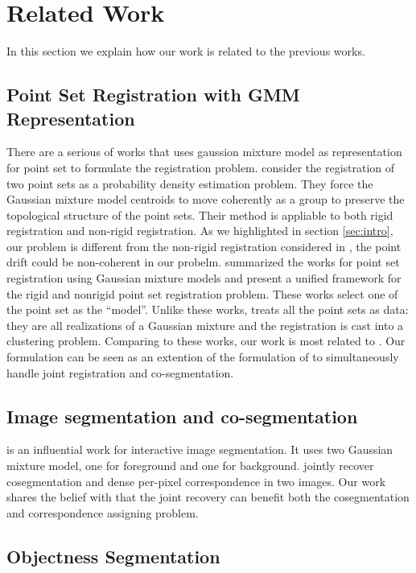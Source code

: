\section{Related Work}
\label{sec:rw}
In this section we explain how our work is related to the previous works.
\subsection{Point Set Registration with GMM Representation}
\label{subsec:gmmreg}
There are a serious of works that uses gaussion mixture model as representation for point set to formulate the registration problem.
\cite{CPD} consider the registration of two point sets as a probability density estimation problem. They force the Gaussian mixture model centroids to move coherently as a group to preserve the topological structure of the point sets. Their method is appliable to both rigid registration and non-rigid registration. As we highlighted in section \ref{sec:intro}, our problem is different from the non-rigid registration considered in \cite{CPD}, the point drift could be non-coherent in our probelm.\cite{GMM_PAMI} summarized the works for point set registration using Gaussian mixture models and present a unified framework for the rigid and nonrigid point set registration problem. These works select one of the point set as the ``model''. Unlike these works, \cite{Evangelidis2014} treats all the point sets as data: they are all realizations of a Gaussian mixture and the registration is cast into a clustering problem. Comparing to these works, our work is most related to \cite{Evangelidis2014}. Our formulation can be seen as an extention of the formulation of \cite{Evangelidis2014} to simultaneously handle joint registration and co-segmentation.
\subsection{Image segmentation and co-segmentation}
\label{subsec:coseg}
\cite{grabcut} is an influential work for interactive image segmentation. It uses two Gaussian mixture model, one for foreground and one for background. \cite{Taniai_2016_CVPR} jointly recover cosegmentation and dense per-pixel correspondence in two images. Our work shares the belief with \cite{Taniai_2016_CVPR} that the joint recovery can benefit both the cosegmentation and correspondence assigning problem.

\subsection{Objectness Segmentation}
\label{subsec:objectness}
\cite{3DReasoningfromBlockstoStability}
\cite{pixelobjectness}